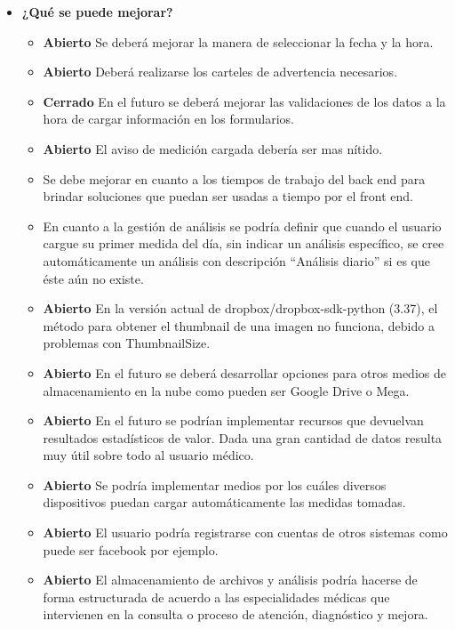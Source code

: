 \begin{itemize}
 		\item \textbf{¿Qué se puede mejorar?}
 		\begin{itemize}
 
 			\item \textbf{Abierto} Se deberá mejorar la manera de seleccionar la fecha y la hora.
 			\item \textbf{Abierto} Deberá realizarse los carteles de advertencia necesarios.
		    \item \textbf{Cerrado} En el futuro se deberá mejorar las validaciones de los datos a la hora de cargar información en los formularios. 
			 \item \textbf{Abierto}  El aviso de medición cargada debería ser mas nítido.
			 \item Se debe mejorar en cuanto a los tiempos de trabajo del back end para brindar soluciones que puedan ser usadas a tiempo por el front end.
			 \item En cuanto a la gestión de análisis se podría definir que cuando el usuario cargue su primer medida del día, sin indicar un análisis específico, se cree automáticamente un análisis con descripción ``Análisis diario'' si es que éste aún no existe.	
	          \item \textbf{Abierto} En la versión actual de dropbox/dropbox-sdk-python (3.37), el método para obtener el thumbnail de una imagen no funciona, debido a problemas con ThumbnailSize.			 		 		    
		        \item \textbf{Abierto} En el futuro se deberá desarrollar opciones para otros medios de almacenamiento en la nube como pueden ser Google Drive o Mega.	
		    \item \textbf{Abierto} En el futuro se podrían implementar recursos que devuelvan resultados estadísticos de valor. Dada una gran cantidad de datos resulta muy útil sobre todo al usuario médico.
		    \item \textbf{Abierto} Se podría implementar medios por los cuáles diversos dispositivos puedan cargar automáticamente las medidas tomadas.
		    \item \textbf{Abierto} El usuario podría registrarse con cuentas de otros sistemas como puede ser facebook por ejemplo.
		    \item \textbf{Abierto} El almacenamiento de archivos y análisis podría hacerse de forma estructurada de acuerdo a las especialidades médicas que intervienen en la consulta o proceso de atención, diagnóstico y mejora.          
 		\end{itemize}
 		
 		
 	\end{itemize}